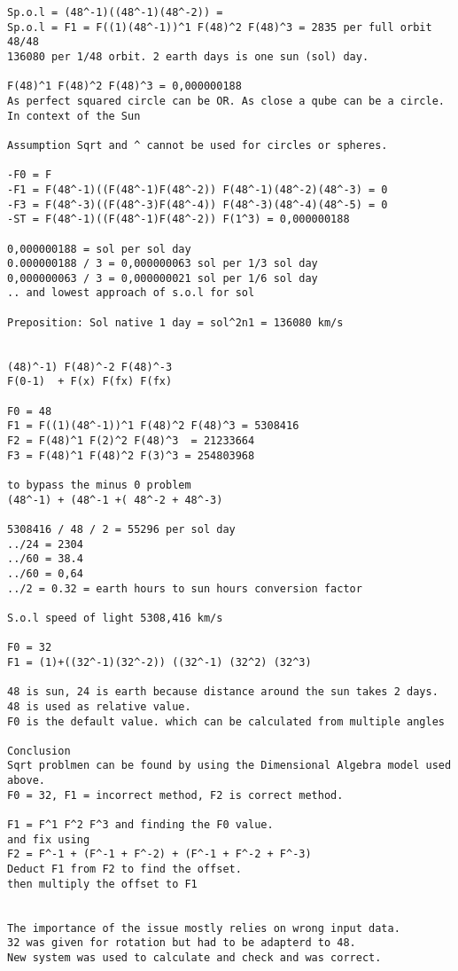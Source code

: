 \documentclass{thesis}
\begin{document}
\begin{verbatim}
Sp.o.l = (48^-1)((48^-1)(48^-2)) = 
Sp.o.l = F1 = F((1)(48^-1))^1 F(48)^2 F(48)^3 = 2835 per full orbit 48/48
136080 per 1/48 orbit. 2 earth days is one sun (sol) day.

F(48)^1 F(48)^2 F(48)^3 = 0,000000188 
As perfect squared circle can be OR. As close a qube can be a circle. 
In context of the Sun

Assumption Sqrt and ^ cannot be used for circles or spheres.

-F0 = F
-F1 = F(48^-1)((F(48^-1)F(48^-2)) F(48^-1)(48^-2)(48^-3) = 0
-F3 = F(48^-3)((F(48^-3)F(48^-4)) F(48^-3)(48^-4)(48^-5) = 0
-ST = F(48^-1)((F(48^-1)F(48^-2)) F(1^3) = 0,000000188

0,000000188 = sol per sol day
0.000000188 / 3 = 0,000000063 sol per 1/3 sol day
0,000000063 / 3 = 0,000000021 sol per 1/6 sol day 
.. and lowest approach of s.o.l for sol

Preposition: Sol native 1 day = sol^2n1 = 136080 km/s   


(48)^-1) F(48)^-2 F(48)^-3 
F(0-1)  + F(x) F(fx) F(fx)

F0 = 48
F1 = F((1)(48^-1))^1 F(48)^2 F(48)^3 = 5308416
F2 = F(48)^1 F(2)^2 F(48)^3  = 21233664
F3 = F(48)^1 F(48)^2 F(3)^3 = 254803968

to bypass the minus 0 problem
(48^-1) + (48^-1 +( 48^-2 + 48^-3)

5308416 / 48 / 2 = 55296 per sol day
../24 = 2304
../60 = 38.4
../60 = 0,64
../2 = 0.32 = earth hours to sun hours conversion factor

S.o.l speed of light 5308,416 km/s

F0 = 32
F1 = (1)+((32^-1)(32^-2)) ((32^-1) (32^2) (32^3)

48 is sun, 24 is earth because distance around the sun takes 2 days.
48 is used as relative value. 
F0 is the default value. which can be calculated from multiple angles

Conclusion
Sqrt problmen can be found by using the Dimensional Algebra model used above.
F0 = 32, F1 = incorrect method, F2 is correct method. 

F1 = F^1 F^2 F^3 and finding the F0 value.
and fix using
F2 = F^-1 + (F^-1 + F^-2) + (F^-1 + F^-2 + F^-3)
Deduct F1 from F2 to find the offset. 
then multiply the offset to F1


The importance of the issue mostly relies on wrong input data.
32 was given for rotation but had to be adapterd to 48.
New system was used to calculate and check and was correct.

\end{verbatim}
\end{document}
